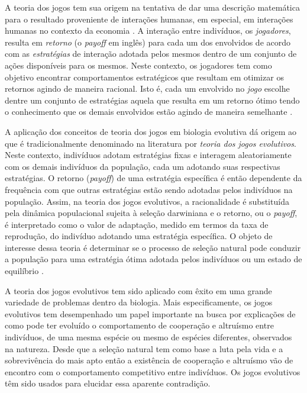 \documentclass[
	12pt,				%
	openany,			%
	oneoside,			%
	a4paper,			%
	english,			%
	spanish,			%
	brazil,				%
	]{abntex2}
\begin{document}
A teoria dos jogos tem sua origem na tentativa de dar uma descrição matemática para o resultado proveniente de interações humanas, em especial, em interações humanas no contexto da economia \cite{cccnature}. A interação entre indivíduos, os \textit{jogadores}, resulta em \textit{retorno} (o \textit{payoff} em inglês) para cada um dos envolvidos de acordo com as \textit{estratégias} de interação adotada pelos mesmos dentro de um conjunto de ações disponíveis para os mesmos. Neste contexto, os jogadores tem como objetivo encontrar  comportamentos estratégicos que resultam em otimizar os retornos agindo de maneira racional. Isto é, cada um envolvido no \textit{jogo} escolhe dentre um conjunto de estratégias aquela que resulta em um retorno ótimo tendo o conhecimento que os demais envolvidos estão agindo de maneira semelhante \cite{HGT}.    

A aplicação dos conceitos de teoria dos jogos em biologia evolutiva dá origem ao que é tradicionalmente denominado na literatura por \textit{teoria dos jogos evolutivos}. Neste contexto, indivíduos adotam estratégias fixas e interagem aleatoriamente com os demais indivíduos da população, cada um adotando suas respectivas estratégias. O retorno (\textit{payoff}) de uma estratégia específica é então dependente da frequência com que outras estratégias estão sendo adotadas pelos indivíduos na população. Assim, na teoria dos jogos evolutivos, a racionalidade é substituída pela dinâmica populacional sujeita \`{a} seleção darwiniana e o retorno, ou o \textit{payoff}, é interpretado como o valor de adaptação, medido em termos da taxa de reprodução, do indivíduo adotando uma estratégia específica. O objeto de interesse dessa teoria é determinar se o processo de seleção natural pode conduzir a população para uma estratégia ótima adotada pelos indivíduos ou um estado de equilíbrio \cite{MAYBOOK}.  


A teoria dos jogos evolutivos tem sido aplicado com êxito em uma grande variedade de problemas dentro da biologia. Mais especificamente, os jogos evolutivos tem desempenhado um papel importante na busca por explicações de como pode ter evoluído o comportamento de cooperação e altruísmo entre indivíduos, de uma mesma espécie ou mesmo de espécies diferentes, observados na natureza. Desde que a seleção natural tem como base a luta pela vida e a sobrevivência do mais apto então a existência de cooperação e altruísmo vão de encontro com o comportamento competitivo entre indivíduos. Os jogos evolutivos têm sido usados para elucidar essa aparente contradição.   
\end{document}

